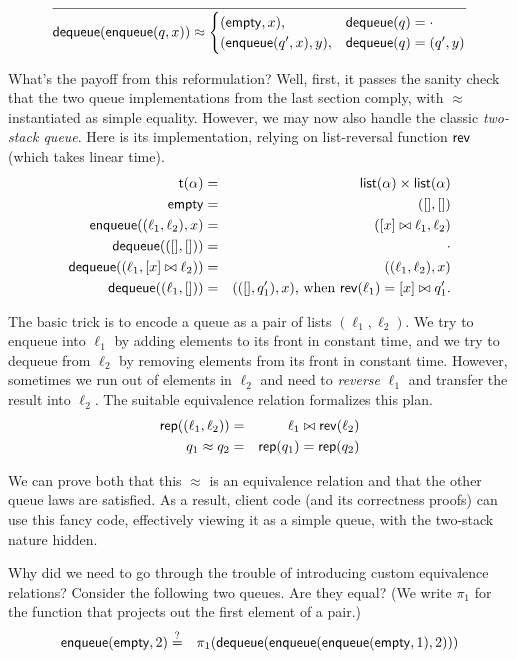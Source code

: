 \documentclass{amsbook}
\theoremstyle{definition}
\theoremstyle{remark}
\numberwithin{section}{chapter}
\numberwithin{equation}{chapter}
\begin{document}
$$\infer{\mt{dequeue}(\mt{enqueue}(q, x)) \approx \begin{cases}
    (\mt{empty}, x), & \mt{dequeue}(q) = \cdot \\
    (\mt{enqueue}(q', x), y), & \mt{dequeue}(q) = (q', y)
  \end{cases}}{}$$

What's the payoff from this reformulation?
Well, first, it passes the sanity check that the two queue implementations from the last section comply, with $\approx$ instantiated as simple equality.
However, we may now also handle the classic \emph{two-stack queue}.
Here is its implementation, relying on list-reversal function $\mathsf{rev}$ (which takes linear time).
\begin{eqnarray*}
  \mathsf{t(\alpha)} &=& \mathsf{list}(\alpha) \times \mathsf{list}(\alpha) \\
  \mathsf{empty} &=& ([], []) \\
  \mathsf{enqueue}((\ell_1, \ell_2), x) &=& ([x] \bowtie \ell_1, \ell_2) \\
  \mathsf{dequeue}(([], [])) &=& \cdot \\
  \mathsf{dequeue}((\ell_1, [x] \bowtie \ell_2)) &=& ((\ell_1, \ell_2), x) \\
  \mathsf{dequeue}((\ell_1, [])) &=& (([], q'_1), x)\textrm{, when $\mathsf{rev}(\ell_1) = [x] \bowtie q'_1$.}
\end{eqnarray*}

The basic trick is to encode a queue as a pair of lists $(\ell_1, \ell_2)$.
We try to enqueue into $\ell_1$ by adding elements to its front in constant time, and we try to dequeue from $\ell_2$ by removing elements from its front in constant time.
However, sometimes we run out of elements in $\ell_2$ and need to \emph{reverse} $\ell_1$ and transfer the result into $\ell_2$.
The suitable equivalence relation formalizes this plan.
\begin{eqnarray*}
  \mathsf{rep}((\ell_1, \ell_2)) &=& \ell_1 \bowtie \mathsf{rev}(\ell_2) \\
  q_1 \approx q_2 &=& \mathsf{rep}(q_1) = \mathsf{rep}(q_2)
\end{eqnarray*}

We can prove both that this $\approx$ is an equivalence relation and that the other queue laws are satisfied.
As a result, client code (and its correctness proofs) can use this fancy code, effectively viewing it as a simple queue, with the two-stack nature hidden.

Why did we need to go through the trouble of introducing custom equivalence relations?
Consider the following two queues.
Are they equal?
(We write $\pi_1$ for the function that projects out the first element of a pair.)
\begin{eqnarray*}
  \mathsf{enqueue}(\mathsf{empty}, 2) &\stackrel{?}{=}& \pi_1(\mathsf{dequeue}(\mathsf{enqueue}(\mathsf{enqueue}(\mathsf{empty}, 1), 2)))
\end{eqnarray*}
\end{document}
